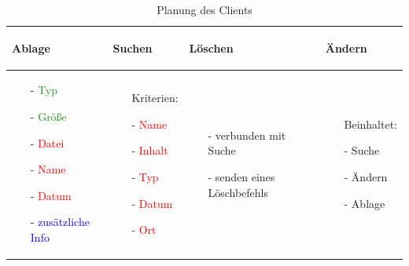 \documentclass[12pt,a4paper,bibliography=totocnumbered,listof=totocnumbered]{scrartcl}
\begin{document}
\vspace{1em}
\begin{table}[!h]
	\centering
	\begin{tabular}{|p{3.3cm}|p{3.3cm}|p{3.3cm}|p{3.3cm}|}
		\hline
			\begin{center}
				\textbf{Ablage}
			\end{center}
			&
			\begin{center}
				\textbf{Suchen}
			\end{center}
			&
			\begin{center}
				\textbf{Löschen}
			\end{center}
			&
			\begin{center}
				\textbf{Ändern}
			\end{center}
		\\
		\hline
			\begin{itemize}[]
				\item[-]\textcolor{ForestGreen}{Typ}
				\item[-]\textcolor{ForestGreen}{Größe}
				\item[-]\textcolor{red}{Datei}
				\item[-]\textcolor{red}{Name}
				\item[-]\textcolor{red}{Datum}
				\item[-]\textcolor{blue}{zusätzliche Info}
			\end{itemize}
			&
			\begin{itemize}[]
				\item[]Kriterien:
				\item[-]\textcolor{red}{Name}
				\item[-]\textcolor{red}{Inhalt}
				\item[-]\textcolor{red}{Typ}
				\item[-]\textcolor{red}{Datum}
				\item[-]\textcolor{red}{Ort}
			\end{itemize}
			&
			\begin{itemize}[]
				\item[-]verbunden mit Suche
				\item[-]senden eines Löschbefehls
			\end{itemize}
			&
			\begin{itemize}[]
				\item[]Beinhaltet:
				\item[-]Suche
				\item[-]Ändern
				\item[-]Ablage
			\end{itemize}
			\\
		\hline
	\end{tabular}
	\caption{Planung des Clients}
	\label{tab:PlanungClient}
\end{table}
\end{document}
